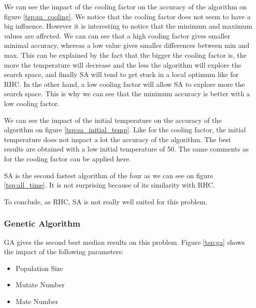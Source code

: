 \documentclass[twocolumn, 10pt]{article}
\begin{document}
				We can see the impact of the cooling factor on the accuracy of the algorithm on figure \ref{tsp:sa_cooling}. We notice that the cooling factor does not seem to have a big influence. However it is interesting to notice that the minimum and maximum values are affected. We can can see that a high cooling factor gives smaller minimal accuracy, whereas a low value gives smaller differences between min and max. This can be explained by the fact that the bigger the cooling factor is, the more the temperature will decrease and the less the algorithm will explore the search space, and finally SA will tend to get stuck in a local optimum like for RHC. In the other hand, a low cooling factor will allow SA to explore more the search space. This is why we can see that the minimum accuracy is better with a low cooling factor.

				We can see the impact of the initial temperature on the accuracy of the algorithm on figure \ref{tsp:sa_initial_temp}. Like for the cooling factor, the initial temperature does not impact a lot the accuracy of the algorithm. The best results are obtained with a low initial temperature of 50. The same comments as for the cooling factor can be applied here.

				SA is the second fastest algorithm of the four as we can see on figure \ref{tsp:all_time}. It is not surprising because of its similarity with RHC.

				To conclude, as RHC, SA is not really well suited for this problem.
			\subsubsection*{Genetic Algorithm}
				GA gives the second best median results on this problem. Figure \ref{tsp:ga} shows the impact of the following parameters:
				\begin{itemize}
					\item Population Size
					\item Mutate Number
					\item Mate Number
				\end{itemize}
\end{document}
